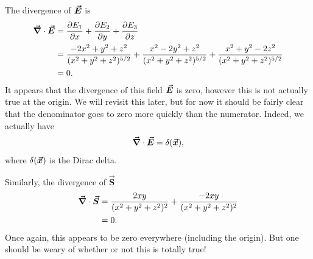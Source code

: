 \documentclass[12pt]{article} %
\begin{document}
\begin{solution}
    The divergence of $\boldsymbol{\vec{E}}$ is
    \begin{align*}
        \boldsymbol{\vec{\nabla}} \cdot \boldsymbol{\vec{E}} &= \frac{\partial E_1}{\partial x} + \frac{\partial E_2}{\partial y} + \frac{\partial E_3}{\partial z}\\
        &= \frac{-2x^2+y^2+z^2}{(x^2+y^2+z^2)^{5/2}} + \frac{x^2-2y^2+z^2}{(x^2+y^2+z^2)^{5/2}} + \frac{x^2+y^2-2z^2}{(x^2+y^2+z^2)^{5/2}}\\
        &= 0.
    \end{align*}
    It appears that the divergence of this field $\boldsymbol{\vec{E}}$ is zero, however this is not actually true at the origin. We will revisit this later, but for now it should be fairly clear that the denominator goes to zero more quickly than the numerator. Indeed, we actually have
    \[
        \boldsymbol{\vec{\nabla}} \cdot \boldsymbol{\vec{E}} = \delta(\boldsymbol{\vec{x}}),
    \]
    where $\delta(\boldsymbol{\vec{x}})$ is the Dirac delta.

    Similarly, the divergence of $\boldsymbol{\vec{S}}$
    \begin{align*}
        \boldsymbol{\vec{\nabla}} \cdot \boldsymbol{\vec{S}} &= \frac{2xy}{(x^2+y^2+z^2)^2} + \frac{-2xy}{(x^2+y^2+z^2)^2}\\
        &=0.
    \end{align*}
    Once again, this appears to be zero everywhere (including the origin). But one should be weary of whether or not this is totally true!
\end{solution}
\end{document}
